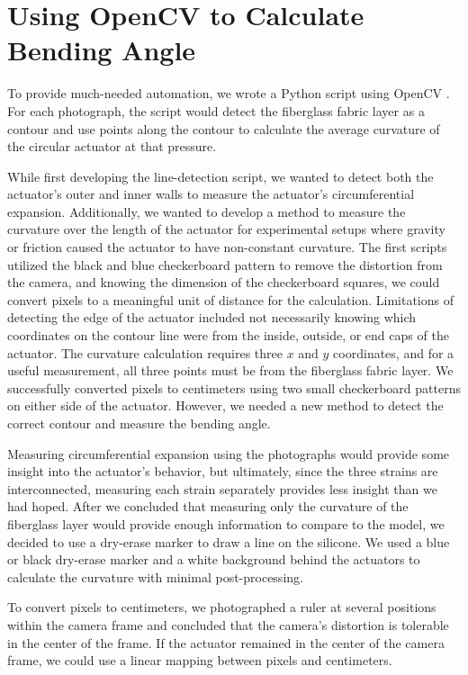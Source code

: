 \section{Using OpenCV to Calculate Bending Angle}

To provide much-needed automation, we wrote a Python script using OpenCV \cite{opencv_library}. For each photograph, the script would detect the fiberglass fabric layer as a contour and use points along the contour to calculate the average curvature of the circular actuator at that pressure. 

While first developing the line-detection script, we wanted to detect both the actuator's outer and inner walls to measure the actuator's circumferential expansion. Additionally, we wanted to develop a method to measure the curvature over the length of the actuator for experimental setups where gravity or friction caused the actuator to have non-constant curvature. The first scripts utilized the black and blue checkerboard pattern to remove the distortion from the camera, and knowing the dimension of the checkerboard squares, we could convert pixels to a meaningful unit of distance for the calculation. Limitations of detecting the edge of the actuator included not necessarily knowing which coordinates on the contour line were from the inside, outside, or end caps of the actuator. The curvature calculation requires three $x$ and $y$ coordinates, and for a useful measurement, all three points must be from the fiberglass fabric layer. We successfully converted pixels to centimeters using two small checkerboard patterns on either side of the actuator. However, we needed a new method to detect the correct contour and measure the bending angle. 

Measuring circumferential expansion using the photographs would provide some insight into the actuator's behavior, but ultimately, since the three strains are interconnected, measuring each strain separately provides less insight than we had hoped. After we concluded that measuring only the curvature of the fiberglass layer would provide enough information to compare to the model, we decided to use a dry-erase marker to draw a line on the silicone. We used a blue or black dry-erase marker and a white background behind the actuators to calculate the curvature with minimal post-processing. 

To convert pixels to centimeters, we photographed a ruler at several positions within the camera frame and concluded that the camera's distortion is tolerable in the center of the frame. If the actuator remained in the center of the camera frame, we could use a linear mapping between pixels and centimeters. 

